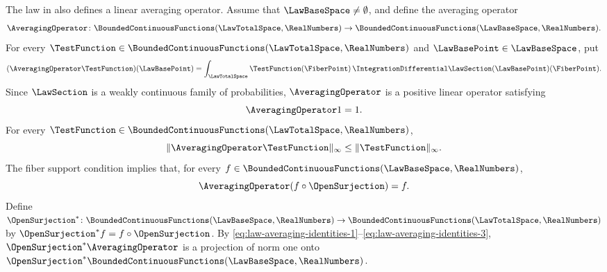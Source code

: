 \begin{remark}\label{rem:laws-averaging-operator}
The law in  also defines a linear averaging operator.
Assume that
$\LawBaseSpace\ne\emptyset$,
and define the averaging operator
\[
 \AveragingOperator\colon
 \BoundedContinuousFunctions(\LawTotalSpace,\RealNumbers)
 \to\BoundedContinuousFunctions(\LawBaseSpace,\RealNumbers).
\]
For every
$\TestFunction\in\BoundedContinuousFunctions(\LawTotalSpace,\RealNumbers)$
and
$\LawBasePoint\in\LawBaseSpace$,
put
\[
 (\AveragingOperator\TestFunction)(\LawBasePoint)
 =\int_{\LawTotalSpace}\TestFunction(\FiberPoint)
   \,\IntegrationDifferential\LawSection(\LawBasePoint)(\FiberPoint).
\]
Since
$\LawSection$
is a weakly continuous family of probabilities,
$\AveragingOperator$
is a positive linear operator satisfying
\begin{equation}\label{eq:law-averaging-identities-1}
 \AveragingOperator1=1.
\end{equation}
For every
$\TestFunction\in\BoundedContinuousFunctions(\LawTotalSpace,\RealNumbers)$,
\begin{equation}\label{eq:law-averaging-identities-2}
 \|\AveragingOperator\TestFunction\|_\infty\leq\|\TestFunction\|_\infty.
\end{equation}
The fiber support condition implies that,
for every
$f\in\BoundedContinuousFunctions(\LawBaseSpace,\RealNumbers)$,
\begin{equation}\label{eq:law-averaging-identities-3}
 \AveragingOperator(f\circ\OpenSurjection)=f.
\end{equation}
Define
$\OpenSurjection^*\colon
 \BoundedContinuousFunctions(\LawBaseSpace,\RealNumbers)
 \to\BoundedContinuousFunctions(\LawTotalSpace,\RealNumbers)$
by
$\OpenSurjection^*f=f\circ\OpenSurjection$.
By \eqref{eq:law-averaging-identities-1}--\eqref{eq:law-averaging-identities-3},
$\OpenSurjection^*\AveragingOperator$
is a projection of norm one onto
$\OpenSurjection^*\BoundedContinuousFunctions(\LawBaseSpace,\RealNumbers)$.
\end{remark}
